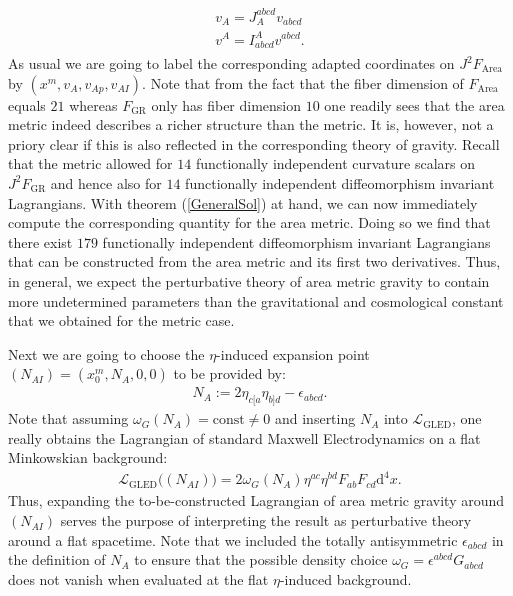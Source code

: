 \begin{align}
    \begin{aligned}
    v_A = J_A^{abcd}v_{abcd} \\
    v^A = I^A_{abcd}v^{abcd}.
    \end{aligned}
\end{align}
As usual we are going to label the corresponding adapted coordinates on $J^2F_{\text{Area}}$ by $(x^m,v_A,v_{Ap},v_{AI})$. 
Note that from the fact that the fiber dimension of $F_{\text{Area}}$ equals $21$ whereas $F_{\text{GR}}$ only has fiber dimension $10$ one readily sees that the area metric indeed describes a richer structure than the metric. It is, however, not a priory clear if this is also reflected in the corresponding theory of gravity. Recall that the metric allowed for $14$ functionally independent curvature scalars on $J^2F_{\text{GR}}$ and hence also for $14$ functionally independent diffeomorphism invariant Lagrangians. With theorem (\ref{GeneralSol}) at hand, we can now immediately compute the corresponding quantity for the area metric. Doing so we find that there exist $179$ functionally independent diffeomorphism invariant Lagrangians that can be constructed from the area metric and its first two derivatives. Thus, in general, we expect the perturbative theory of area metric gravity to contain more undetermined parameters than the gravitational and cosmological constant that we obtained for the metric case.


Next we are going to choose the $\eta$-induced expansion point $(N_{AI}) = (x_0^m, N_A, 0,0)$ to be provided by:
\begin{align}
N_A := 2 \eta_{c[a} \eta_{b]d} - \epsilon_{abcd}.
\end{align}
Note that assuming $\omega_G(N_A) = \text{const} \neq 0$ and inserting $N_A$ into $\mathcal{L}_{\text{GLED}}$, one really obtains the Lagrangian of standard Maxwell Electrodynamics on a flat Minkowskian background:
\begin{align}
    \mathcal{L}_{\text{GLED}}\bigl((N_{AI})\bigr ) = 2 \omega_G(N_A) \eta^{ac}\eta^{bd}F_{ab}F_{cd} \mathrm{d}^4x.
\end{align}
Thus, expanding the to-be-constructed Lagrangian of area metric gravity around $(N_{AI})$ serves the purpose of interpreting the result as perturbative theory around a flat spacetime. Note that we included the totally antisymmetric $\epsilon_{abcd}$ in the definition of $N_A$ to ensure that  the possible density choice $\omega_G = \epsilon^{abcd}G_{abcd}$ does not vanish when evaluated at the flat $\eta$-induced background. 

